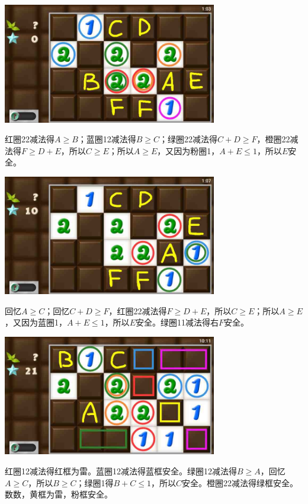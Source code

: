 \subsection{} %
\begin{center}
    \includegraphics[width=0.7\textwidth]{puzzlelow/201-1.jpg}
\end{center}
红圈22减法得$A\ge B$；蓝圈12减法得$B\ge C$；绿圈22减法得$C+D\ge F$，橙圈22减法得$F\ge D+E$，所以$C\ge E$；所以$A\ge E$，又因为粉圈1，$A+E\le 1$，所以$E$安全。
\begin{center}
    \includegraphics[width=0.7\textwidth]{puzzlelow/201-2.jpg}
\end{center}
回忆$A\ge C$；回忆$C+D\ge F$，红圈22减法得$F\ge D+E$，所以$C\ge E$；所以$A\ge E$，又因为蓝圈1，$A+E\le 1$，所以$E$安全。绿圈11减法得右$F$安全。
\begin{center}
    \includegraphics[width=0.7\textwidth]{puzzlelow/201-3.jpg}
\end{center}
红圈12减法得红框为雷。蓝圈12减法得蓝框安全。绿圈12减法得$B\ge A$，回忆$A\ge C$，所以$B\ge C$；绿圈1得$B+C\le 1$，所以$C$安全。橙圈22减法得绿框安全。数数，黄框为雷，粉框安全。
